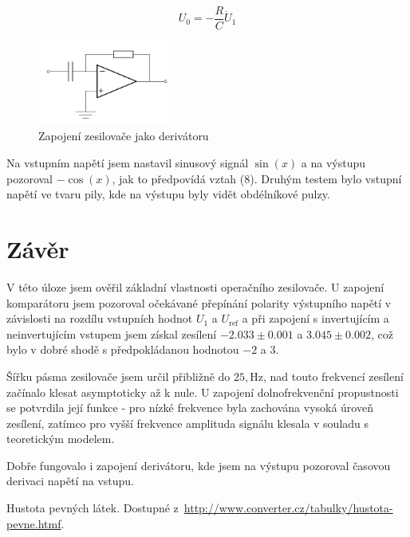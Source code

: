 \documentclass[a4paper,11pt]{article}
\begin{document}
\begin{equation}
U_0 = - \frac{R}{C} \dot U_1
\end{equation}


\begin{figure}[htpb]
    \centering
    \includegraphics[width=0.4\textwidth]{derivator_sch.jpg}
    \caption{Zapojení zesilovače jako derivátoru}
\end{figure}


Na vstupním napětí jsem nastavil sinusový signál $ \sin(x) $  a na výstupu pozoroval $ - \cos(x) $, jak to předpovídá vztah (8). Druhým testem bylo vstupní napětí ve tvaru pily, kde na výstupu byly vidět obdélníkové pulzy. 

\section{Závěr}

V této úloze jsem ověřil základní vlastnosti operačního zesilovače. U zapojení komparátoru jsem pozoroval očekávané přepínání polarity výstupního napětí v závislosti na rozdílu vstupních hodnot $U_1$ a $U_\text{ref}$ a při zapojení s invertujícím a neinvertujícím vstupem jsem získal zesílení $-2.033 \pm 0.001$ a $ 3.045 \pm 0.002 $, což bylo v dobré shodě s předpokládanou hodnotou $ -2 $ a $ 3 $.

Šířku pásma zesilovače jsem určil přibližně do $25,\mathrm{Hz}$, nad touto frekvencí zesílení začínalo klesat asymptoticky až k nule. U zapojení dolnofrekvenční propustnosti se potvrdila její funkce - pro nízké frekvence byla zachována vysoká úroveň zesílení, zatímco pro vyšší frekvence amplituda signálu klesala v souladu s teoretickým modelem.

Dobře fungovalo i zapojení derivátoru, kde jsem na výstupu pozoroval časovou derivaci napětí na vstupu. 



\begin{thebibliography}{0}
 Hustota pevných látek. Dostupné z~\url{http://www.converter.cz/tabulky/hustota-pevne.htmf}.   
\end{thebibliography}
\end{document}
